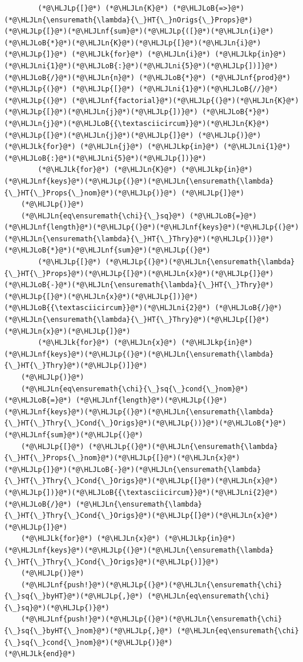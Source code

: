 \documentclass[12pt,a4paper]{article}
\newcommand{\HLJLk}[1]{\textcolor[RGB]{148,91,176}{\textbf{#1}}}
\newcommand{\HLJLkp}[1]{\textcolor[RGB]{148,91,176}{\textbf{#1}}}
\newcommand{\HLJLn}[1]{#1}
\newcommand{\HLJLnf}[1]{\textcolor[RGB]{66,102,213}{#1}}
\newcommand{\HLJLni}[1]{\textcolor[RGB]{59,151,46}{#1}}
\newcommand{\HLJLoB}[1]{\textcolor[RGB]{102,102,102}{\textbf{#1}}}
\newcommand{\HLJLp}[1]{#1}
\begin{document}
\begin{lstlisting}
		(*@\HLJLp{[}@*) (*@\HLJLn{K}@*) (*@\HLJLoB{=>}@*) (*@\HLJLn{\ensuremath{\lambda}{\_}HT{\_}nOrigs{\_}Props}@*)(*@\HLJLp{[}@*)(*@\HLJLnf{sum}@*)(*@\HLJLp{([}@*)(*@\HLJLn{i}@*)(*@\HLJLoB{*}@*)(*@\HLJLn{K}@*)(*@\HLJLp{[}@*)(*@\HLJLn{i}@*)(*@\HLJLp{]}@*) (*@\HLJLk{for}@*) (*@\HLJLn{i}@*) (*@\HLJLkp{in}@*) (*@\HLJLni{1}@*)(*@\HLJLoB{:}@*)(*@\HLJLni{5}@*)(*@\HLJLp{])]}@*)(*@\HLJLoB{/}@*)(*@\HLJLn{n}@*) (*@\HLJLoB{*}@*) (*@\HLJLnf{prod}@*)(*@\HLJLp{(}@*) (*@\HLJLp{[}@*) (*@\HLJLni{1}@*)(*@\HLJLoB{//}@*)(*@\HLJLp{(}@*) (*@\HLJLnf{factorial}@*)(*@\HLJLp{(}@*)(*@\HLJLn{K}@*)(*@\HLJLp{[}@*)(*@\HLJLn{j}@*)(*@\HLJLp{])}@*) (*@\HLJLoB{*}@*)  (*@\HLJLn{j}@*)(*@\HLJLoB{{\textasciicircum}}@*)(*@\HLJLn{K}@*)(*@\HLJLp{[}@*)(*@\HLJLn{j}@*)(*@\HLJLp{]}@*) (*@\HLJLp{)}@*) (*@\HLJLk{for}@*) (*@\HLJLn{j}@*) (*@\HLJLkp{in}@*) (*@\HLJLni{1}@*)(*@\HLJLoB{:}@*)(*@\HLJLni{5}@*)(*@\HLJLp{])}@*) 
		(*@\HLJLk{for}@*) (*@\HLJLn{K}@*) (*@\HLJLkp{in}@*) (*@\HLJLnf{keys}@*)(*@\HLJLp{(}@*)(*@\HLJLn{\ensuremath{\lambda}{\_}HT{\_}Props{\_}nom}@*)(*@\HLJLp{)}@*) (*@\HLJLp{]}@*)
	(*@\HLJLp{)}@*)
	(*@\HLJLn{eq\ensuremath{\chi}{\_}sq}@*) (*@\HLJLoB{=}@*) (*@\HLJLnf{length}@*)(*@\HLJLp{(}@*)(*@\HLJLnf{keys}@*)(*@\HLJLp{(}@*)(*@\HLJLn{\ensuremath{\lambda}{\_}HT{\_}Thry}@*)(*@\HLJLp{))}@*)(*@\HLJLoB{*}@*)(*@\HLJLnf{sum}@*)(*@\HLJLp{(}@*)
		(*@\HLJLp{[}@*) (*@\HLJLp{(}@*)(*@\HLJLn{\ensuremath{\lambda}{\_}HT{\_}Props}@*)(*@\HLJLp{[}@*)(*@\HLJLn{x}@*)(*@\HLJLp{]}@*)(*@\HLJLoB{-}@*)(*@\HLJLn{\ensuremath{\lambda}{\_}HT{\_}Thry}@*)(*@\HLJLp{[}@*)(*@\HLJLn{x}@*)(*@\HLJLp{])}@*)(*@\HLJLoB{{\textasciicircum}}@*)(*@\HLJLni{2}@*) (*@\HLJLoB{/}@*) (*@\HLJLn{\ensuremath{\lambda}{\_}HT{\_}Thry}@*)(*@\HLJLp{[}@*)(*@\HLJLn{x}@*)(*@\HLJLp{]}@*)
		(*@\HLJLk{for}@*) (*@\HLJLn{x}@*) (*@\HLJLkp{in}@*) (*@\HLJLnf{keys}@*)(*@\HLJLp{(}@*)(*@\HLJLn{\ensuremath{\lambda}{\_}HT{\_}Thry}@*)(*@\HLJLp{)]}@*)
	(*@\HLJLp{)}@*)
	(*@\HLJLn{eq\ensuremath{\chi}{\_}sq{\_}cond{\_}nom}@*) (*@\HLJLoB{=}@*) (*@\HLJLnf{length}@*)(*@\HLJLp{(}@*)(*@\HLJLnf{keys}@*)(*@\HLJLp{(}@*)(*@\HLJLn{\ensuremath{\lambda}{\_}HT{\_}Thry{\_}Cond{\_}Origs}@*)(*@\HLJLp{))}@*)(*@\HLJLoB{*}@*)(*@\HLJLnf{sum}@*)(*@\HLJLp{(}@*)
	(*@\HLJLp{[}@*) (*@\HLJLp{(}@*)(*@\HLJLn{\ensuremath{\lambda}{\_}HT{\_}Props{\_}nom}@*)(*@\HLJLp{[}@*)(*@\HLJLn{x}@*)(*@\HLJLp{]}@*)(*@\HLJLoB{-}@*)(*@\HLJLn{\ensuremath{\lambda}{\_}HT{\_}Thry{\_}Cond{\_}Origs}@*)(*@\HLJLp{[}@*)(*@\HLJLn{x}@*)(*@\HLJLp{])}@*)(*@\HLJLoB{{\textasciicircum}}@*)(*@\HLJLni{2}@*) (*@\HLJLoB{/}@*) (*@\HLJLn{\ensuremath{\lambda}{\_}HT{\_}Thry{\_}Cond{\_}Origs}@*)(*@\HLJLp{[}@*)(*@\HLJLn{x}@*)(*@\HLJLp{]}@*)
	(*@\HLJLk{for}@*) (*@\HLJLn{x}@*) (*@\HLJLkp{in}@*) (*@\HLJLnf{keys}@*)(*@\HLJLp{(}@*)(*@\HLJLn{\ensuremath{\lambda}{\_}HT{\_}Thry{\_}Cond{\_}Origs}@*)(*@\HLJLp{)]}@*)
	(*@\HLJLp{)}@*)
	(*@\HLJLnf{push!}@*)(*@\HLJLp{(}@*)(*@\HLJLn{\ensuremath{\chi}{\_}sq{\_}byHT}@*)(*@\HLJLp{,}@*) (*@\HLJLn{eq\ensuremath{\chi}{\_}sq}@*)(*@\HLJLp{)}@*)
	(*@\HLJLnf{push!}@*)(*@\HLJLp{(}@*)(*@\HLJLn{\ensuremath{\chi}{\_}sq{\_}byHT{\_}nom}@*)(*@\HLJLp{,}@*) (*@\HLJLn{eq\ensuremath{\chi}{\_}sq{\_}cond{\_}nom}@*)(*@\HLJLp{)}@*)
(*@\HLJLk{end}@*)


\end{lstlisting}
\end{document}
